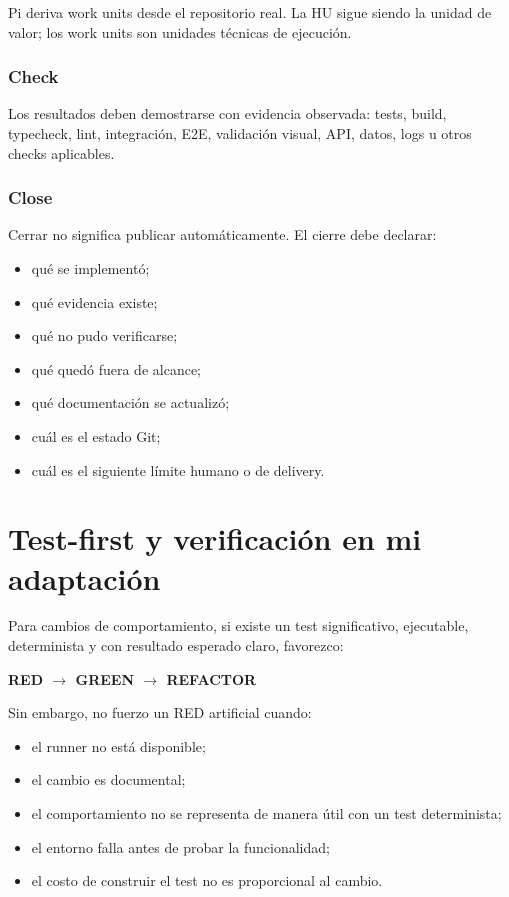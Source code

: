 \documentclass[11pt,a4paper]{article}
\begin{document}
Pi deriva work units desde el repositorio real. La HU sigue siendo la unidad de valor; los work units son unidades técnicas de ejecución.

\subsubsection{Check}

Los resultados deben demostrarse con evidencia observada: tests, build, typecheck, lint, integración, E2E, validación visual, API, datos, logs u otros checks aplicables.

\subsubsection{Close}

Cerrar no significa publicar automáticamente. El cierre debe declarar:

\begin{itemize}
    \item qué se implementó;
    \item qué evidencia existe;
    \item qué no pudo verificarse;
    \item qué quedó fuera de alcance;
    \item qué documentación se actualizó;
    \item cuál es el estado Git;
    \item cuál es el siguiente límite humano o de delivery.
\end{itemize}

\section{Test-first y verificación en mi adaptación}

Para cambios de comportamiento, si existe un test significativo, ejecutable, determinista y con resultado esperado claro, favorezco:

\begin{center}
\Large\textbf{\color{PrimaryDark}RED \(\rightarrow\) GREEN \(\rightarrow\) REFACTOR}
\end{center}

Sin embargo, no fuerzo un RED artificial cuando:

\begin{itemize}
    \item el runner no está disponible;
    \item el cambio es documental;
    \item el comportamiento no se representa de manera útil con un test determinista;
    \item el entorno falla antes de probar la funcionalidad;
    \item el costo de construir el test no es proporcional al cambio.
\end{itemize}
\end{document}
